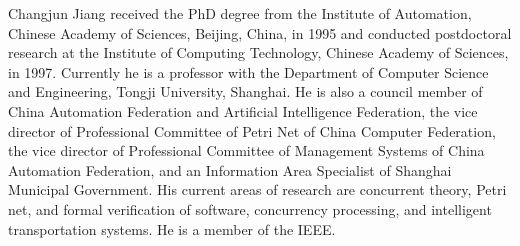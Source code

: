 \documentclass[journal]{IEEEtran}
\begin{document}
\begin{IEEEbiography}{Changjun Jiang}
received the PhD degree from the Institute of Automation, Chinese Academy of Sciences, Beijing, China, in 1995 and conducted postdoctoral research at the Institute of Computing Technology, Chinese Academy of Sciences, in 1997. Currently he is a professor with the Department of Computer Science and Engineering, Tongji University, Shanghai. He is also a council member of China Automation Federation and Artificial Intelligence Federation, the vice director of Professional Committee of Petri Net of China Computer Federation, the vice director of Professional Committee of Management
Systems of China Automation Federation, and an Information Area Specialist of Shanghai Municipal Government. His current areas of research are concurrent theory, Petri net, and formal verification of software, concurrency processing, and intelligent transportation systems. He is a member of the IEEE.
\end{IEEEbiography}
\end{document}
